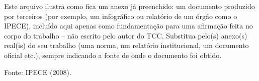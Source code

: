 \label{an:dinamica-das-classes-sociais}

Este arquivo ilustra como fica um anexo já preenchido: um documento produzido por terceiros (por exemplo, um infográfico ou relatório de um órgão como o IPECE), incluído aqui apenas como fundamentação para uma afirmação feita no corpo do trabalho -- não escrito pelo autor do TCC. Substitua pelo(s) anexo(s) real(is) do seu trabalho (uma norma, um relatório institucional, um documento oficial etc.), sempre indicando a fonte de onde o documento foi obtido.

Fonte: IPECE (2008).

